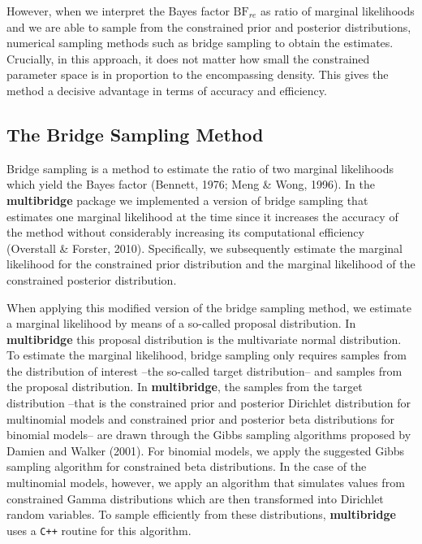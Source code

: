 \documentclass[
  english,
  man,floatsintext]{apa6}
\begin{document}
However, when we interpret the Bayes factor \(\text{BF}_{re}\) as ratio of marginal likelihoods and we are able to sample from the constrained prior and posterior distributions, numerical sampling methods such as bridge sampling to obtain the estimates. Crucially, in this approach, it does not matter how small the constrained parameter space is in proportion to the encompassing density. This gives the method a decisive advantage in terms of accuracy and efficiency.

\hypertarget{the-bridge-sampling-method}{%
\subsection{The Bridge Sampling Method}\label{the-bridge-sampling-method}}

Bridge sampling is a method to estimate the ratio of two marginal likelihoods which yield the Bayes factor (Bennett, 1976; Meng \& Wong, 1996). In the \textbf{multibridge} package we implemented a version of bridge sampling that estimates one marginal likelihood at the time since it increases the accuracy of the method without considerably increasing its computational efficiency (Overstall \& Forster, 2010). Specifically, we subsequently estimate the marginal likelihood for the constrained prior distribution and the marginal likelihood of the constrained posterior distribution.

When applying this modified version of the bridge sampling method, we estimate a marginal likelihood by means of a so-called proposal distribution. In \textbf{multibridge} this proposal distribution is the multivariate normal distribution. To estimate the marginal likelihood, bridge sampling only requires samples from the distribution of interest --the so-called target distribution-- and samples from the proposal distribution. In \textbf{multibridge}, the samples from the target distribution --that is the constrained prior and posterior Dirichlet distribution for multinomial models and constrained prior and posterior beta distributions for binomial models-- are drawn through the Gibbs sampling algorithms proposed by Damien and Walker (2001). For binomial models, we apply the suggested Gibbs sampling algorithm for constrained beta distributions. In the case of the multinomial models, however, we apply an algorithm that simulates values from constrained Gamma distributions which are then transformed into Dirichlet random variables. To sample efficiently from these distributions, \textbf{multibridge} uses a \texttt{C++} routine for this algorithm.
\end{document}
